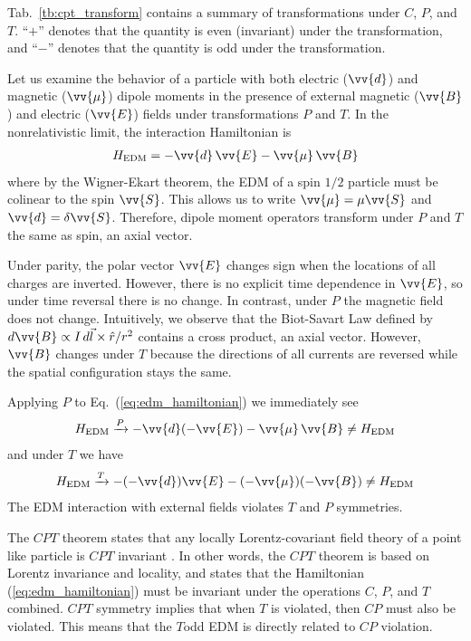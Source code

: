 Tab.~\ref{tb:cpt_transform} contains a summary of transformations under $C$, $P$, and $T$. ``$+$'' denotes that the quantity is even (invariant) under the transformation, and ``$-$'' denotes that the quantity is odd under the transformation.

Let us examine the behavior of a particle with both electric ($\vv{d}$) and magnetic ($\vv{\mu}$) dipole moments in the presence of external magnetic ($\vv{B}$) and electric ($\vv{E}$) fields under transformations $P$ and $T$. In the nonrelativistic limit, the interaction Hamiltonian is 
%
\begin{gather}
    H_\text{EDM} = -\vv{d}\,\vv{E}-\vv{\mu}\,\vv{B} \label{eq:edm_hamiltonian}
\end{gather}
%
where by the Wigner-Ekart theorem, the EDM of a spin $1/2$ particle must be colinear to the spin $\vv{S}$. This allows us to write $\vv{\mu}=\mu\vv{S}$ and $\vv{d}=\delta\vv{S}$. Therefore, dipole moment operators transform under $P$ and $T$ the same as spin, an axial vector. 

Under parity, the polar vector $\vv{E}$ changes sign when the locations of all charges are inverted. However, there is no explicit time dependence in $\vv{E}$, so under time reversal there is no change. In contrast, under $P$ the magnetic field does not change. Intuitively, we observe that the Biot-Savart Law defined by $d\vv{B}\propto I\,d\vec{l} \times \hat{r} /r^2$ contains a cross product, an axial vector. However, $\vv{B}$ changes under $T$ because the directions of all currents are reversed while the spatial configuration stays the same. 

Applying $P$ to Eq.~(\ref{eq:edm_hamiltonian}) we immediately see
%
\begin{gather}
    H_\text{EDM}\xrightarrow{P} -\vv{d}(-\vv{E}) - \vv{\mu}\,\vv{B} \neq H_\text{EDM}
\end{gather}
%
and under $T$ we have
%
\begin{gather}
    H_\text{EDM}\xrightarrow{T} -(-\vv{d})\vv{E} - (-\vv{\mu})(-\vv{B}) \neq H_\text{EDM}
\end{gather}
%
The EDM interaction with external fields violates $T$ and $P$ symmetries. 

The $CPT$ theorem states that any locally Lorentz-covariant field theory of a point like particle is $CPT$ invariant \cite{LUDERS19571, schmidt-wellenburg_quest_2017, cp_violation_wo_strangeness}. In other words, the $CPT$ theorem is based on Lorentz invariance and locality, and states that the Hamiltonian (\ref{eq:edm_hamiltonian}) must be invariant under the operations $C$, $P$, and $T$ combined. $CPT$ symmetry implies that when $T$ is violated, then $CP$ must also be violated. This means that the $T$\textendash odd EDM is directly related to $CP$ violation.

